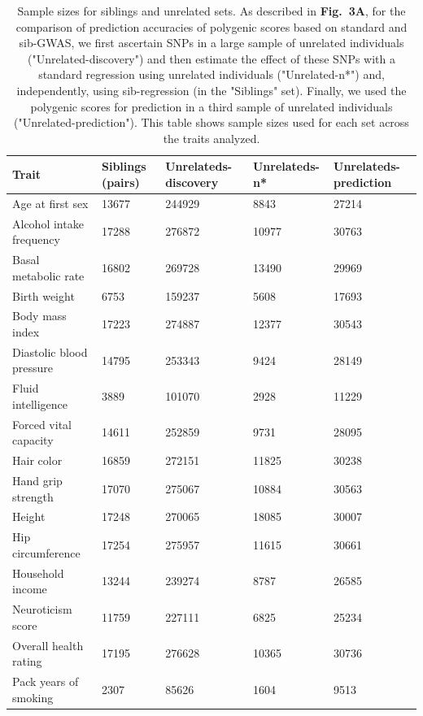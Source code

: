 \documentclass[hidelinks, 12pt]{article}
\begin{document}
\begin{table}[h]
\caption[Sample sizes for siblings and unrelated sets]{\small Sample sizes for siblings and unrelated sets. As described in {\bf Fig.~3A}, for the comparison of prediction accuracies of polygenic scores based on standard and sib-GWAS, we first ascertain SNPs in a large sample of unrelated individuals ("Unrelated-discovery") and then estimate the effect of these SNPs with a standard regression using unrelated individuals ("Unrelated-n*") and, independently, using sib-regression (in the "Siblings" set). Finally, we used the polygenic scores for prediction in a third sample of unrelated individuals ("Unrelated-prediction"). This table shows sample sizes used for each set across the traits analyzed.}
\begin{center}
\small
 \begin{tabular}{| l l l l l |} 
 \hline
 \textbf{Trait} & \textbf{Siblings (pairs)} & \textbf{Unrelateds-discovery} & \textbf{Unrelateds-n*} & \textbf{Unrelateds-prediction}\\ [0.5ex] 
 \hline\hline
  Age at first sex & 13677 & 244929 & 8843 & 27214 \\
Alcohol intake frequency & 17288 & 276872 & 10977 & 30763 \\
Basal metabolic rate & 16802 & 269728 & 13490 & 29969 \\
Birth weight & 6753 & 159237 & 5608 & 17693 \\
Body mass index & 17223 & 274887 & 12377 & 30543 \\
Diastolic blood pressure & 14795 & 253343 & 9424 & 28149 \\
Fluid intelligence & 3889 & 101070 & 2928 & 11229 \\
Forced vital capacity & 14611 & 252859 & 9731 & 28095 \\
Hair color & 16859 & 272151 & 11825 & 30238 \\
Hand grip strength & 17070 & 275067 & 10884 & 30563 \\
Height & 17248 & 270065 & 18085 & 30007 \\
Hip circumference & 17254 & 275957 & 11615 & 30661 \\
Household income & 13244 & 239274 & 8787 & 26585 \\
Neuroticism score & 11759 & 227111 & 6825 & 25234 \\
Overall health rating & 17195 & 276628 & 10365 & 30736 \\
Pack years of smoking & 2307 & 85626 & 1604 & 9513 \\

\end{tabular}
\end{center}
\end{table}
\end{document}
